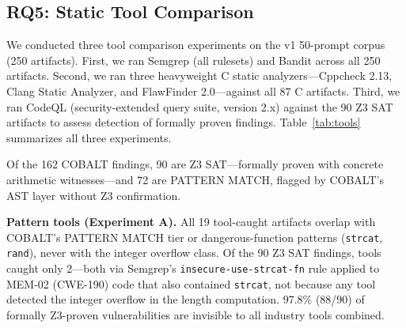 \documentclass[10pt,twocolumn]{article}
\begin{document}
\subsection{RQ5: Static Tool Comparison}

We conducted three tool comparison experiments on the v1 50-prompt corpus
(250 artifacts). First, we ran Semgrep (all rulesets) and Bandit across
all 250 artifacts. Second, we ran three
heavyweight C static analyzers---Cppcheck 2.13, Clang Static Analyzer,
and FlawFinder 2.0---against all 87 C artifacts. Third, we ran CodeQL
(security-extended query suite, version 2.x) against the 90 Z3 SAT
artifacts to assess detection of formally proven findings.
Table~\ref{tab:tools} summarizes all three experiments.

Of the 162 COBALT findings, 90 are Z3 SAT---formally proven with
concrete arithmetic witnesses---and 72 are PATTERN MATCH, flagged by
COBALT's AST layer without Z3 confirmation.

\textbf{Pattern tools (Experiment A).} All 19 tool-caught artifacts
overlap with COBALT's PATTERN MATCH tier or dangerous-function patterns
(\texttt{strcat}, \texttt{rand}), never with the integer overflow class.
Of the 90 Z3 SAT findings, tools caught only 2---both via Semgrep's
\texttt{insecure-use-strcat-fn} rule applied to MEM-02 (CWE-190) code
that also contained \texttt{strcat}, not because any tool detected the
integer overflow in the length computation. 97.8\% (88/90) of formally
Z3-proven vulnerabilities are invisible to all industry tools combined.
\end{document}
